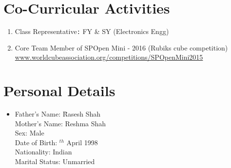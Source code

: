 \documentclass{article}
\begin{document}
	\section*{Co-Curricular Activities}
		\begin{enumerate}
			\item Class Representative\verb|:| FY \& SY (Electronics Engg) 
			\item Core Team Member of SPOpen Mini - 2016 (Rubiks cube competition)\\
			\url{www.worldcubeassociation.org/competitions/SPOpenMini2015}
		\end{enumerate}	
	
	\section*{Personal Details}
		\begin{itemize}
			\item[]
			\begin{tabbing}
				Father's Name: \=Rasesh Shah\\ 
				Mother's Name: \>Reshma Shah\\ 
				Sex: \>Male\\ 
				Date of Birth: $^{th}$ April 1998\\ 
				Nationality: \>Indian\\ 
				Marital Status: \>Unmarried
			\end{tabbing}
		\end{itemize}	
	
\end{document}
